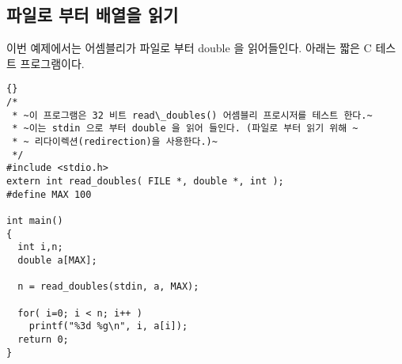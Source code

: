 \subsection{파일로 부터 배열을 읽기}
이번 예제에서는 어셈블리가 파일로 부터 double 을 읽어들인다. 아래는
짧은 C 테스트 프로그램이다. 

\begin{lstlisting}[escapeinside=~~]{}
/*
 * ~이 프로그램은 32 비트 read\_doubles() 어셈블리 프로시저를 테스트 한다.~
 * ~이는 stdin 으로 부터 double 을 읽어 들인다. (파일로 부터 읽기 위해 ~
 * ~ 리다이렉션(redirection)을 사용한다.)~
 */
#include <stdio.h>
extern int read_doubles( FILE *, double *, int );
#define MAX 100

int main()
{
  int i,n;
  double a[MAX];

  n = read_doubles(stdin, a, MAX);

  for( i=0; i < n; i++ )
    printf("%3d %g\n", i, a[i]);
  return 0;
}
\end{lstlisting}

